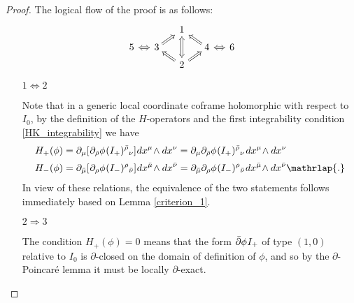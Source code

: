 \documentclass[11pt]{amsart}
\theoremstyle{remark}
\theoremstyle{remark}
\theoremstyle{definition}
\theoremstyle{definition}
\theoremstyle{definition}
\newcommand{\0}{{\scriptstyle 0'}} %
\newcommand{\1}{{\scriptstyle 1'}}
\newcommand{\pt}{\hspace{1pt}} %
\newcommand{\hp}{\hspace{0.5pt}} %
\begin{document}
\begin{proof}

The logical flow of the proof is as follows:
\begin{equation*}
\begin{tikzcd}[column sep=small,row sep=tiny]
					& 									& 1 \arrow[rd, Leftarrow, shorten >=-.2em] 	\arrow[dd, Leftrightarrow]			&	& \\
5 \arrow[r, Leftrightarrow]	& 3 \arrow[ru, Rightarrow, shorten <=-.2em] 	& 																& 4 	& \arrow[l, Leftrightarrow] 6 \\
					&									& 2 \arrow[lu, Rightarrow, shorten >=-.2em] \arrow[ru, Rightarrow, shorten >=-.2em] 	& 	&
\end{tikzcd}
\end{equation*}

\begin{itemize}[leftmargin=\leftmargin-3.5pt]
\setlength{\itemsep}{4pt}

\item[$1 \Leftrightarrow 2$] 

Note that in a generic local coordinate coframe holomorphic with respect to $I_0$, by the definition of the $H$-operators and the first integrability condition \eqref{HK_integrability} we have
{\allowdisplaybreaks
\begin{equation}
\begin{aligned}
H_+(\phi) & = \partial_{\mu} [\hp \partial_{\bar{\rho}}\phi \hp (I_+)^{\bar{\rho}}{}_{\nu}] \hp dx^{\mu} \! \wedge dx^{\nu} = \partial_{\mu} \partial_{\bar{\rho}}\phi \hp (I_+)^{\bar{\rho}}{}_{\nu} \pt dx^{\mu} \! \wedge dx^{\nu} \\[2pt]
H_-(\phi) & = \partial_{\bar{\mu}} [\hp \partial_{\rho}\phi \hp (I_-)^{\rho}{}_{\bar{\nu}}] \hp dx^{\bar{\mu}} \! \wedge dx^{\bar{\nu}} = \partial_{\bar{\mu}}\partial_{\rho}\phi \hp (I_-)^{\rho}{}_{\bar{\nu}} \hp dx^{\bar{\mu}} \! \wedge dx^{\bar{\nu}} \mathrlap{.}
\end{aligned}
\end{equation}
}%
In view of these relations, the equivalence of the two statements follows immediately based on Lemma \ref{criterion_1}. 

\item[$2 \Rightarrow 3$] 

The condition $H_+(\phi) = 0$ means that the form $\bar{\partial}\phi \hp I_+$ of type $(1,0)$ relative to $I_0$ is $\partial$-closed on the domain of definition of $\phi$, and so by the $\partial$\pt-\hp Poincar\'e lemma it must be locally $\partial$-exact. 


\end{itemize}
\end{proof}
\end{document}
